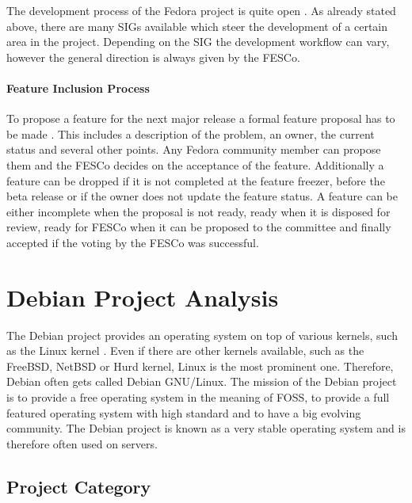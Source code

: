 The development process of the Fedora project is quite open
\cite{FedoraReleaseEngineering,FedoraSIG}. As already stated above, there are
many \acp{SIG} available which steer the development of a certain area in the
project. Depending on the \ac{SIG} the development workflow can vary, however
the general direction is always given by the \ac{FESCo}.

\paragraph{Feature Inclusion Process}

To propose a feature for the next major release a formal feature proposal has
to be made \cite{FedoraFeatures,FedoraFESCo}. This includes a description of
the problem, an owner, the current status and several other points. Any Fedora
community member can propose them and the \ac{FESCo} decides on the acceptance
of the feature. Additionally a feature can be dropped if it is not completed at
the feature freezer, before the beta release or if the owner does not update
the feature status. A feature can be either incomplete when the proposal is not
ready, ready when it is disposed for review, ready for \ac{FESCo} when it can
be proposed to the committee and finally accepted if the voting by the
\ac{FESCo} was successful.


\section{Debian Project Analysis} %


The Debian project provides an operating system on top of various kernels, such
as the Linux kernel \cite{DebianAbout,DebianPorts}. Even if there are other
kernels available, such as the FreeBSD, NetBSD or Hurd kernel, Linux is the
most prominent one. Therefore, Debian often gets called Debian \ac{GNU}/Linux.
The mission of the Debian project is to provide a free operating system in the
meaning of \ac{FOSS}, to provide a full featured operating system with high
standard and to have a big evolving community. The Debian project is known as a
very stable operating system and is therefore often used on servers.

\subsection{Project Category}


